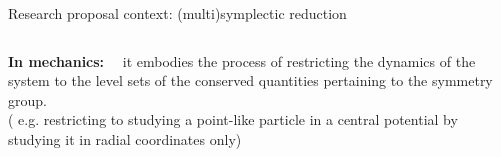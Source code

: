 \documentclass[beamer,10pt]{standalone}
\begin{document}
\begin{frame}{Research proposal context: (multi)symplectic reduction}
\begin{columns}
		\begin{column}{0.6\textwidth}
				\textbf{\color{UniGreen}In mechanics:}~~
			it embodies the process of restricting the dynamics of the system to the level sets of the conserved quantities pertaining to the symmetry group.		
			\\
			\color{gray}\small( e.g. restricting to studying a point-like particle in a central potential by studying it in radial coordinates only)
		\end{column}	
	\end{columns}	


\end{frame}

\end{document}
